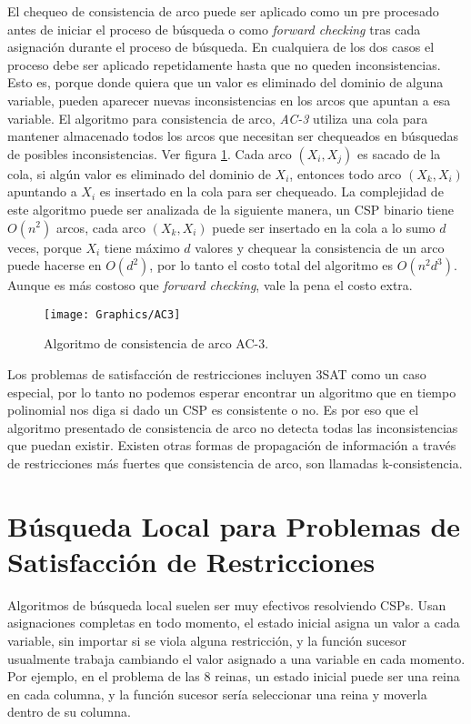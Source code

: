 El chequeo de consistencia de arco puede ser aplicado como un pre procesado antes de iniciar el proceso de b\'usqueda o como \emph{forward checking} tras cada asignaci\'on durante el proceso de b\'usqueda. En cualquiera de los dos casos el proceso debe ser aplicado repetidamente hasta que no queden inconsistencias. Esto es, porque donde quiera que un valor es eliminado del dominio de alguna variable, pueden aparecer nuevas inconsistencias en los arcos que apuntan a esa variable. El algoritmo para consistencia de arco, \emph{AC-3} utiliza una cola para mantener almacenado todos los arcos que necesitan ser chequeados en b\'usquedas de posibles inconsistencias. Ver figura \ref{AC3}. Cada arco $(X_{i},X_{j})$ es sacado de la cola, si alg\'un valor es eliminado del dominio de $X_{i}$, entonces todo arco $(X_{k},X_{i})$ apuntando a $X_{i}$ es insertado en la cola para ser chequeado. La complejidad de este algoritmo puede ser analizada de la siguiente manera, un CSP binario tiene $O(n^{2})$ arcos, cada arco $(X_{k},X_{i})$ puede ser insertado en la cola a lo sumo $d$ veces, porque $X_{i}$ tiene m\'aximo $d$ valores y chequear la consistencia de un arco puede hacerse en $O(d^{2})$, por lo tanto el costo total del algoritmo es $O(n^{2}d^{3})$. Aunque es m\'as costoso que \emph{forward checking}, vale la pena el costo extra.

\begin{figure}[h]
	\begin{center}
		\texttt{[image: Graphics/AC3]}
		\caption{Algoritmo de consistencia de arco AC-3.}
		\label{AC3}
	\end{center}	
\end{figure}

Los problemas de satisfacci\'on de restricciones incluyen 3SAT como un caso especial, por lo tanto no podemos esperar encontrar un algoritmo que en tiempo polinomial nos diga si dado un CSP es consistente o no. Es por eso que el algoritmo presentado de consistencia de arco no detecta todas las inconsistencias que puedan existir. Existen otras formas de propagaci\'on de informaci\'on a trav\'es de restricciones m\'as fuertes que consistencia de arco, son llamadas k-consistencia.

\section{B\'usqueda Local para Problemas de Satisfacci\'on de Restricciones}

Algoritmos de b\'usqueda local suelen ser muy efectivos resolviendo CSPs. Usan asignaciones completas en todo momento, el estado inicial asigna un valor a cada variable, sin importar si se viola alguna restricci\'on, y la funci\'on sucesor usualmente trabaja cambiando el valor asignado a una variable en cada momento. Por ejemplo, en el problema de las 8 reinas, un estado inicial puede ser una reina en cada columna, y la funci\'on sucesor ser\'ia seleccionar una reina y moverla dentro de su columna.

